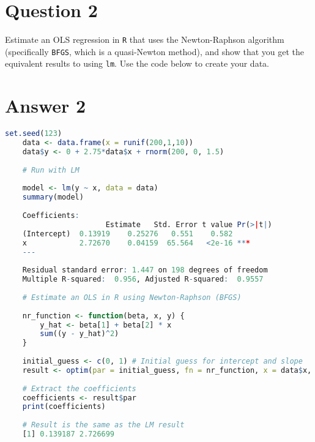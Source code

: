 \documentclass[12pt,letterpaper]{article}
\begin{document}
\newpage

\section*{Question 2}
\noindent Estimate an OLS regression in \texttt{R} that uses the Newton-Raphson algorithm (specifically \texttt{BFGS}, which is a quasi-Newton method), and show that you get the equivalent results to using \texttt{lm}. Use the code below to create your data.
\vspace{.5cm}
 

	\vspace{.25cm}
\section*{Answer 2} 
\vspace{.25cm}

\begin{lstlisting}[language=R]
	set.seed(123)
	data <- data.frame(x = runif(200,1,10))
	data$y <- 0 + 2.75*data$x + rnorm(200, 0, 1.5)
	
	# Run with LM 
	
	model <- lm(y ~ x, data = data)
	summary(model)
	
	Coefficients:
				       Estimate   Std. Error t value Pr(>|t|)    
	(Intercept)  0.13919    0.25276   0.551    0.582    
	x            2.72670    0.04159  65.564   <2e-16 ***
	---
	
	Residual standard error: 1.447 on 198 degrees of freedom
	Multiple R-squared:  0.956,	Adjusted R-squared:  0.9557 
	
	# Estimate an OLS in R using Newton-Raphson (BFGS)
	
	nr_function <- function(beta, x, y) {
		y_hat <- beta[1] + beta[2] * x
		sum((y - y_hat)^2)
	}
	
	initial_guess <- c(0, 1) # Initial guess for intercept and slope
	result <- optim(par = initial_guess, fn = nr_function, x = data$x, y = data$y, method = "BFGS")
	
	# Extract the coefficients
	coefficients <- result$par
	print(coefficients)
	
	# Result is the same as the LM result
	[1] 0.139187 2.726699
	
	\end{lstlisting}
\end{document}
